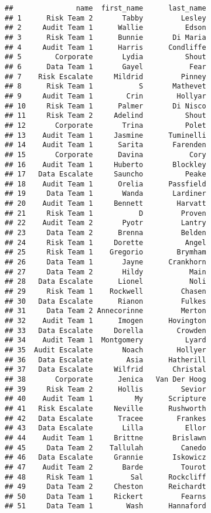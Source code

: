 \documentclass[]{article}
\begin{document}
\begin{verbatim}
##               name  first_name      last_name
## 1      Risk Team 2       Tabby         Lesley
## 2     Audit Team 1      Wallie          Edson
## 3      Risk Team 1      Bunnie       Di Maria
## 4     Audit Team 1      Harris      Condliffe
## 5        Corporate       Lydia          Shout
## 6      Data Team 1       Gayel           Fear
## 7    Risk Escalate     Mildrid         Pinney
## 8      Risk Team 1           S       Mathevet
## 9     Audit Team 1        Crin        Hollyar
## 10     Risk Team 1      Palmer       Di Nisco
## 11     Risk Team 2     Adelind          Shout
## 12       Corporate       Trina          Polet
## 13    Audit Team 1     Jasmine      Tuminelli
## 14    Audit Team 1      Sarita       Farenden
## 15       Corporate      Davina           Cory
## 16    Audit Team 1     Huberto       Blockley
## 17   Data Escalate     Sauncho          Peake
## 18    Audit Team 1      Orelia      Passfield
## 19     Data Team 1       Wanda       Lardiner
## 20    Audit Team 1     Bennett        Harvatt
## 21     Risk Team 1           D         Proven
## 22    Audit Team 2       Pyotr         Lantry
## 23     Data Team 2      Brenna         Belden
## 24     Risk Team 1     Dorette          Angel
## 25     Risk Team 1    Gregorio        Brymham
## 26     Data Team 1       Jayne      Crankhorn
## 27     Data Team 2       Hildy           Main
## 28   Data Escalate      Lionel           Noli
## 29     Risk Team 1    Rockwell         Chasen
## 30   Data Escalate      Rianon         Fulkes
## 31     Data Team 2 Annecorinne         Merton
## 32    Audit Team 1      Imogen      Hovington
## 33   Data Escalate     Dorella        Crowden
## 34    Audit Team 1  Montgomery          Lyard
## 35  Audit Escalate       Noach        Hollyer
## 36   Data Escalate        Asia      Hatherill
## 37   Data Escalate     Wilfrid       Christal
## 38       Corporate      Jenica   Van Der Hoog
## 39     Risk Team 2      Hollis         Sevior
## 40    Audit Team 1          My      Scripture
## 41   Risk Escalate     Neville      Rushworth
## 42   Data Escalate      Tracee        Frankes
## 43   Data Escalate       Lilla          Ellor
## 44    Audit Team 1     Brittne       Brislawn
## 45     Data Team 2    Tallulah         Canedo
## 46   Data Escalate     Grannie       Iskowicz
## 47    Audit Team 2       Barde         Tourot
## 48     Risk Team 1         Sal      Rockcliff
## 49     Data Team 2     Cheston      Reichardt
## 50     Data Team 1     Rickert         Fearns
## 51     Data Team 1        Wash      Hannaford

\end{verbatim}
\end{document}
